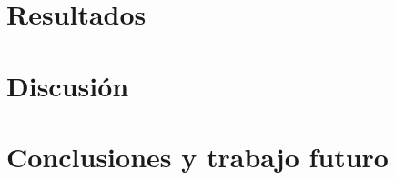 \documentclass[12pt,oneside,reqno]{report}
\begin{document}
\chapter{Resultados}\label{cap:resultados}


\chapter{Discusión}\label{cap:discusion}


\chapter{Conclusiones y trabajo futuro}\label{cap:conclusiones}


\startappendices
{}\label{ap:material-suplementario}


\label{ap:resultados-adicionales}


\startbibliography
\begin{singlespace}
  
\end{singlespace}
\end{document}
